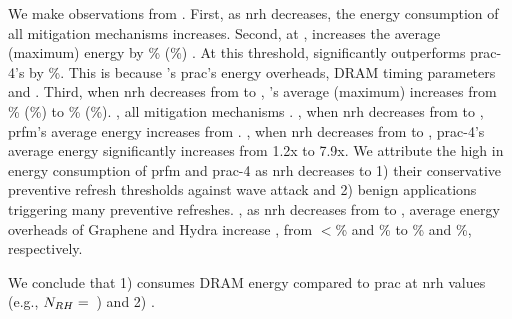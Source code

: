 We make  observations from .
First, as \gls{nrh} decreases, the energy consumption  of all  mitigation mechanisms increases.
Second, at , \X{} increases the average (maximum) energy  by \% (\%) .
At this threshold, \X{} significantly outperforms \gls{prac}-4's  by \%.
This is because \X{}'s    \gls{prac}'s energy overheads,  DRAM timing parameters and  .
Third, when \gls{nrh} decreases from  to , \X{}'s average (maximum)  increases from \% (\%) to \% (\%).
, \X{}  all  mitigation mechanisms .
, when \gls{nrh} decreases from  to , \gls{prfm}'s average energy  increases from .
, when \gls{nrh} decreases from  to , \gls{prac}-4's average energy  significantly increases from 1.2x to 7.9x.
We attribute the high  in energy consumption  of \gls{prfm} and \gls{prac}-4 as \gls{nrh} decreases to
1) their conservative preventive refresh thresholds against  wave attack and
2) benign applications triggering many preventive refreshes.
, as \gls{nrh} decreases from  to , average energy overheads of Graphene and Hydra increase , from $<$\% and \% to \% and \%, respectively.

We conclude that
1) \X{} consumes  DRAM energy compared to \gls{prac} at \gls{nrh} values  (e.g., $N_{RH}{} =$~) and
2) \X{}  .

